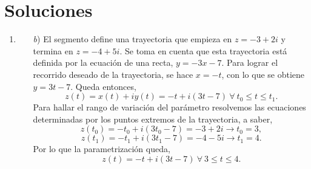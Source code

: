 \documentclass[10pt,a4paper]{article}
\begin{document}
\section*{Soluciones}
\label{sec:sol}
\begin{enumerate}
	
\item  

\begin{enumerate}
	
	
	\item [\textit{b})]  %
	El segmento define una trayectoria que empieza en $z=-3+2i$ y termina en $z=-4+5i$. 
	Se toma en cuenta que esta trayectoria est\'a definida por la ecuaci\'on de una recta, 
	$y=-3x-7$. Para lograr el recorrido deseado de la trayectoria, se hace $x=-t$, 
	con lo que se obtiene $y=3t-7$. Queda entonces,
	\begin{equation}
	z(t)=x(t)+iy(t)=-t+i(3t-7) ~ \forall ~ t_0 \leq t \leq t_1.
	\label{eq:sol1b1}
	\end{equation}
	Para hallar el rango de variaci\'on del par\'ametro resolvemos las 
	ecuaciones determinadas por los puntos extremos de la trayectoria,
	a saber,
	\begin{equation}
	z(t_0)=-t_0+i(3t_0-7)=-3+2i \rightarrow t_0=3,
	\label{eq:sol1b2}
	\end{equation}	
	\begin{equation}
	z(t_1)=-t_1+i(3t_1-7)=-4-5i \rightarrow t_1=4.
	\label{eq:sol1b3}
	\end{equation}	
	Por lo que la parametrizaci\'on queda,
	\begin{equation}
	z(t)=-t+i(3t-7) ~ \forall ~ 3 \leq t \leq 4.
	\label{eq:sol1b4}
	\end{equation}


\end{enumerate}
\end{enumerate}
\end{document}
